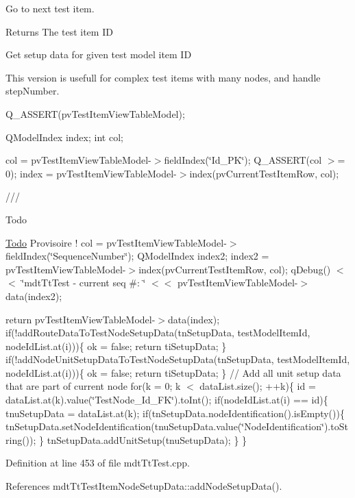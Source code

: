 Go to next test item. 

\begin{DoxyReturn}{Returns}
The test item I\-D
\end{DoxyReturn}
Get setup data for given test model item I\-D

This version is usefull for complex test items with many nodes, and handle step\-Number.

Q\-\_\-\-A\-S\-S\-E\-R\-T(pv\-Test\-Item\-View\-Table\-Model);

Q\-Model\-Index index; int col;

col = pv\-Test\-Item\-View\-Table\-Model-\/$>$field\-Index(\char`\"{}\-Id\-\_\-\-P\-K\char`\"{}); Q\-\_\-\-A\-S\-S\-E\-R\-T(col $>$= 0); index = pv\-Test\-Item\-View\-Table\-Model-\/$>$index(pv\-Current\-Test\-Item\-Row, col);

///\begin{DoxyRefDesc}{Todo}
\item[\hyperlink{todo__todo000088}{Todo}]Provisoire ! col = pv\-Test\-Item\-View\-Table\-Model-\/$>$field\-Index(\char`\"{}\-Sequence\-Number\char`\"{}); Q\-Model\-Index index2; index2 = pv\-Test\-Item\-View\-Table\-Model-\/$>$index(pv\-Current\-Test\-Item\-Row, col); q\-Debug() $<$$<$ \char`\"{}mdt\-Tt\-Test -\/ current seq \#\-: \char`\"{} $<$$<$ pv\-Test\-Item\-View\-Table\-Model-\/$>$data(index2);\end{DoxyRefDesc}


return pv\-Test\-Item\-View\-Table\-Model-\/$>$data(index); if(!add\-Route\-Data\-To\-Test\-Node\-Setup\-Data(tn\-Setup\-Data, test\-Model\-Item\-Id, node\-Id\-List.\-at(i)))\{ ok = false; return ti\-Setup\-Data; \} if(!add\-Node\-Unit\-Setup\-Data\-To\-Test\-Node\-Setup\-Data(tn\-Setup\-Data, test\-Model\-Item\-Id, node\-Id\-List.\-at(i)))\{ ok = false; return ti\-Setup\-Data; \} // Add all unit setup data that are part of current node for(k = 0; k $<$ data\-List.\-size(); ++k)\{ id = data\-List.\-at(k).value(\char`\"{}\-Test\-Node\-\_\-\-Id\-\_\-\-F\-K\char`\"{}).to\-Int(); if(node\-Id\-List.\-at(i) == id)\{ tnu\-Setup\-Data = data\-List.\-at(k); if(tn\-Setup\-Data.\-node\-Identification().is\-Empty())\{ tn\-Setup\-Data.\-set\-Node\-Identification(tnu\-Setup\-Data.\-value(\char`\"{}\-Node\-Identification\char`\"{}).to\-String()); \} tn\-Setup\-Data.\-add\-Unit\-Setup(tnu\-Setup\-Data); \} \} 

Definition at line 453 of file mdt\-Tt\-Test.\-cpp.



References mdt\-Tt\-Test\-Item\-Node\-Setup\-Data\-::add\-Node\-Setup\-Data().

